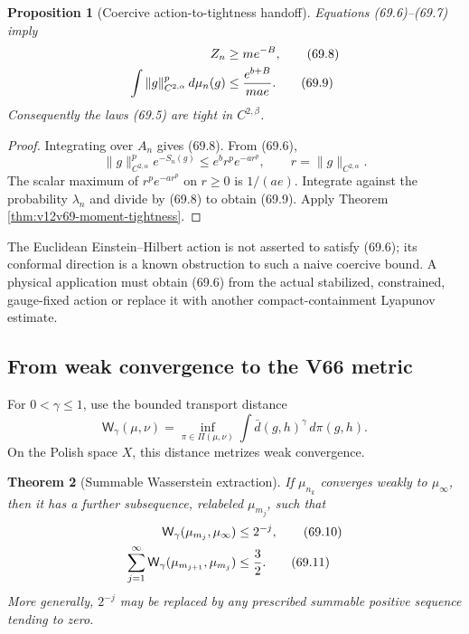 \documentclass[11pt]{article}
\newtheorem{theorem}{Theorem}[section]
\newtheorem{proposition}[theorem]{Proposition}
\theoremstyle{remark}
\begin{document}
\begin{proposition}[Coercive action-to-tightness handoff]
\label{prop:v12v69-action}
Equations (69.6)--(69.7) imply
\begin{align}
 Z_n&\geq me^{-B},                                \tag{69.8}\\
 \int\|g\|_{C^{2,\alpha}}^p\,d\mu_n(g)
 &\leq
 {e^{b+B}\over ma e}.                             \tag{69.9}
\end{align}
Consequently the laws (69.5) are tight in \(C^{2,\beta}\).
\end{proposition}

\begin{proof}
Integrating over \(A_n\) gives (69.8).  From (69.6),
\[
 \|g\|_{C^{2,\alpha}}^pe^{-S_n(g)}
 \leq
 e^b r^pe^{-ar^p},
 \qquad r=\|g\|_{C^{2,\alpha}}.
\]
The scalar maximum of \(r^pe^{-ar^p}\) on \(r\geq0\) is
\(1/(ae)\).  Integrate against the probability \(\lambda_n\) and
divide by (69.8) to obtain (69.9).  Apply Theorem
\ref{thm:v12v69-moment-tightness}.
\end{proof}

The Euclidean Einstein--Hilbert action is not asserted to satisfy
(69.6); its conformal direction is a known obstruction to such a
naive coercive bound.  A physical application must obtain (69.6)
from the actual stabilized, constrained, gauge-fixed action or
replace it with another compact-containment Lyapunov estimate.

\subsection{From weak convergence to the V66 metric}

For \(0<\gamma\leq1\), use the bounded transport distance
\[
 {\mathsf W}_\gamma(\mu,\nu)
 =
 \inf_{\pi\in\Pi(\mu,\nu)}
 \int\bar d(g,h)^\gamma\,d\pi(g,h).
\]
On the Polish space \(X\), this distance metrizes weak convergence.

\begin{theorem}[Summable Wasserstein extraction]
\label{thm:v12v69-summable-subsequence}
If \(\mu_{n_k}\) converges weakly to \(\mu_\infty\), then it has a
further subsequence, relabeled \(\mu_{m_j}\), such that
\begin{align}
 {\mathsf W}_\gamma(\mu_{m_j},\mu_\infty)
 &\leq2^{-j},                                     \tag{69.10}\\
 \sum_{j=1}^\infty
 {\mathsf W}_\gamma(\mu_{m_{j+1}},\mu_{m_j})
 &\leq {3\over2}.                                 \tag{69.11}
\end{align}
More generally, \(2^{-j}\) may be replaced by any prescribed
summable positive sequence tending to zero.
\end{theorem}
\end{document}

